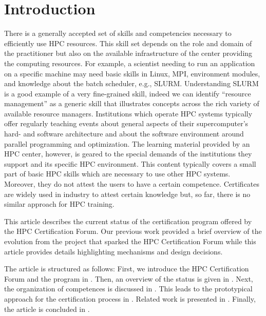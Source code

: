 \documentclass[jocse]{jocseart}
\begin{document}
\keywords{}

\maketitle

\section{Introduction}

There is a generally accepted set of skills and competencies necessary to efficiently use HPC resources.
This skill set depends on the role and domain of the practitioner but also on the available infrastructure of the center providing the computing resources.
For example, a scientist needing to run an application on a specific machine may need basic skills in Linux, MPI, environment modules, and knowledge about the batch scheduler, e.g., SLURM.
Understanding SLURM is a good example of a very fine-grained skill, indeed we can identify “resource management” as a generic skill that illustrates concepts across the rich variety of available resource managers.
Institutions which operate HPC systems typically offer regularly teaching events about general aspects of their supercomputer's hard- and software architecture and about the software environment around parallel programming and optimization.
The learning material provided by an HPC center, however, is geared to the special demands of the institutions they support and its specific HPC environment.
This content typically covers a small part of basic HPC skills which are necessary to use other HPC systems.
Moreover, they do not attest the users to have a certain competence.
Certificates are widely used in industry to attest certain knowledge but, so far, there is no similar approach for HPC training.

This article describes the current status of the certification program offered by the HPC Certification Forum.
Our previous work provided a brief overview of the evolution from the project that sparked  the HPC Certification Forum \cite{TAHCPKHHSS19} while this article provides details highlighting mechanisms and design decisions.

The article is structured as follows:
First, we introduce the HPC Certification Forum and the program in .
Then, an overview of the status is given in .
Next, the organization of competences is discussed in .
This leads to the prototypical approach for the certification process in .
Related work is presented in .
Finally, the article is concluded in .
\end{document}
